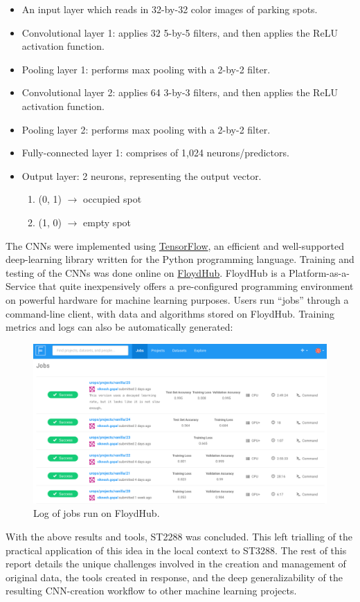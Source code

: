 \documentclass[a4paper, 11pt]{article} %
\begin{document}
	\begin{itemize}
		\item[] An input layer which reads in 32-by-32 color images of parking spots.
		\item[] Convolutional layer 1: applies 32 5-by-5 filters, and then applies the ReLU activation 
		function.
		\item[] Pooling layer 1: performs max pooling with a 2-by-2 filter.
		\item[] Convolutional layer 2: applies 64 3-by-3 filters, and then applies the ReLU activation 
		function.
		\item[] Pooling layer 2: performs max pooling with a 2-by-2 filter.
		\item[] Fully-connected layer 1: comprises of 1,024 neurons/predictors.
		\item[] Output layer: 2 neurons, representing the output vector.
		\vspace*{-4mm}
		\begin{enumerate}
			\setlength\itemsep{-3mm}
			\item[] (0, 1) $\rightarrow$ occupied spot
			\item[] (1, 0) $\rightarrow$ empty spot
		\end{enumerate}
	\end{itemize}
   	The CNNs were implemented using \href{https://www.tensorflow.org}{TensorFlow}, an efficient and 
   	well-supported deep-learning library written for the Python programming language. Training and 
   	testing of the CNNs was done online on \href{https://www.floydhub.com}{FloydHub}. FloydHub is a 
   	Platform-as-a-Service that quite inexpensively offers a pre-configured programming environment on 
   	powerful hardware for machine learning purposes. Users run ``jobs'' through a command-line client, 
   	with data and algorithms stored on FloydHub. Training metrics and logs can also be automatically 
    generated:
    \vskip 5mm
    \begin{figure}[h]
    	\centering
    	\includegraphics[width=14cm]{figures/floydhub.png}
    	\caption{Log of jobs run on FloydHub.}
    \end{figure}
	\newpage
	With the above results and tools, ST2288 was concluded. This left trialling of the practical 
	application of this idea in the local context to ST3288. The rest of this report details the unique 
	challenges involved in the creation and management of original data, the tools created in response, 
	and the deep generalizability of the resulting CNN-creation workflow to other machine learning 
	projects.
\end{document}
